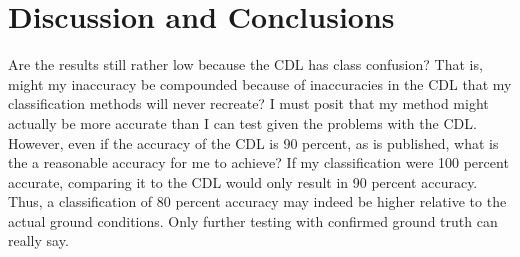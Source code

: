\section{Discussion and Conclusions}

Are the results still rather low because the CDL has class confusion? That is, might my inaccuracy be compounded because of inaccuracies in the CDL that my classification methods will never recreate? I must posit that my method might actually be more accurate than I can test given the problems with the CDL. However, even if the accuracy of the CDL is 90 percent, as is published, what is the a reasonable accuracy for me to achieve? If my classification were 100 percent accurate, comparing it to the CDL would only result in 90 percent accuracy. Thus, a classification of 80 percent accuracy may indeed be higher relative to the actual ground conditions. Only further testing with confirmed ground truth can really say.